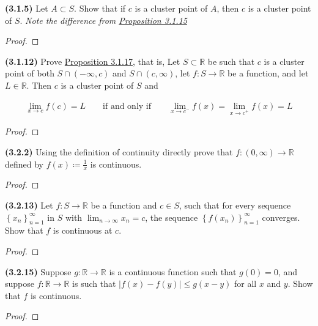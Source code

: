 \documentclass[12pt]{article}
\newcommand{\limit}[1]{\displaystyle \lim_{ {#1} }}
\newcommand{\limtoinf}[1][n]{\displaystyle\lim_{ {#1} \to \infty}}
\newcommand{\abs}[1]{\left| {#1} \right|}
\newcommand{\seq}[2][n]{\left\{ {#2} \right\}_{#1=1}^\infty}
\newcommand{\paren}[1]{\left( {#1} \right)}
\newcommand{\bR}{\mathbb{R}}
\begin{document}
\pagestyle{fancy}
\setlength{\headheight}{14.49998pt}
\fancyfoot[C]{\thepage}

\noindent \textbf{(3.1.5)} Let $A\subset S$. Show that if $c$ is a cluster point of $A$, then $c$ is a cluster point of $S$. \textit{Note the difference from \underline{Proposition 3.1.15}}

\begin{proof}
	\lipsum[1]
\end{proof}

\newpage

\noindent \textbf{(3.1.12)} Prove \underline{Proposition 3.1.17}, that is, Let $S\subset\bR$ be such that $c$ is a cluster point of both $S\cap\paren{-\infty, c}$ and $S\cap\paren{c,\infty}$, let $f:S\to\bR$ be a function, and let $L\in\bR$. Then $c$ is a cluster point of $S$ and

\begin{align*}
	\limit{x\to c}f(c)=L\qquad\text{if and only if}\qquad\limit{x\to c^-}f(x)=\limit{x\to c^+}f(x)=L
\end{align*}

\begin{proof}
	\lipsum[1]
\end{proof}

\newpage

\noindent \textbf{(3.2.2)} Using the definition of continuity directly prove that $f:\paren{0,\infty}\to\bR$ defined by $f(x)\coloneq\frac{1}{x}$ is continuous.

\begin{proof}
	\lipsum[1]
\end{proof}

\newpage

\noindent \textbf{(3.2.13)} Let $f:S\to\bR$ be a function and $c\in S$, such that for every sequence $\seq{x_n}$ in $S$ with $\limtoinf x_n=c$, the sequence $\seq{f(x_n)}$ converges. Show that $f$ is continuous at $c$.

\begin{proof}
	\lipsum[1]
\end{proof}

\newpage

\noindent \textbf{(3.2.15)} Suppose $g:\bR\to\bR$ is a continuous function such that $g(0)=0$, and suppose $f:\bR\to\bR$ is such that $\abs{f(x)-f(y)}\le g(x-y)$ for all $x$ and $y$. Show that $f$ is continuous.

\begin{proof}
	\lipsum[1]
\end{proof}
\end{document}
